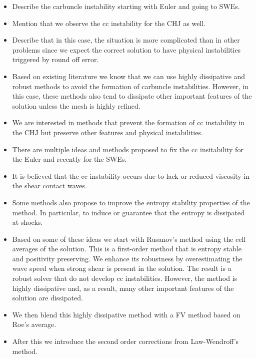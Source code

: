 \documentclass[preprint, 11pt]{article}
\begin{document}
\begin{itemize}
  \item Describe the carbuncle instability starting with Euler and going to SWEs.
  \item Mention that we observe the cc instability for the CHJ as well.
  \item Describe that in this case, the situation is more complicated than in other problems since we
    expect the correct solution to have physical instabilities triggered by round off error.
  \item Based on existing literature we know that we can use highly dissipative and robust methods to
    avoid the formation of carbuncle instabilities. However, in this case, these methods also tend to
    dissipate other important features of the solution unless the mesh is highly refined.
  \item We are interested in methods that prevent the formation of cc instability in the CHJ
    but preserve other features and physical instabilities.
  \item There are multiple ideas and methods proposed to fix the cc insitability for the Euler
    and recently for the SWEs.
  \item It is believed that the cc instability occurs due to lack or reduced viscosity in the shear contact waves.
  \item Some methods also propose to improve the entropy stability properties of the method. In particular, to induce or guarantee that the entropy is dissipated at shocks.
  \item Based on some of these ideas we start with Rusanov's method using the cell averages of the solution.
    This is a first-order method that is entropy stable and positivity preserving. We enhance its robustness by
    overestimating the wave speed when strong shear is present in the solution. The result is a robust solver
    that do not develop cc instabilities. However, the method is highly dissipative and, as a result,
    many other important features of the solution are dissipated.
  \item We then blend this highly dissipative method with a FV method based on Roe's average.
  \item After this we introduce the second order corrections from Law-Wendroff's method.
\end{itemize}
\end{document}
